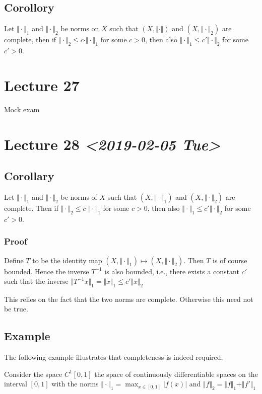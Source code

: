 \documentclass[11pt]{article}
\begin{document}
\subsection{Corollory}
\label{sec:org3adc4fb}
Let \(\Vert \cdot \Vert_1\) and \(\Vert \cdot \Vert_2\) be norms on \(X\) such that
\((X, \Vert \cdot \Vert)\) and \((X, \Vert \cdot \Vert_2)\) are complete, then if
\(\Vert \cdot \Vert_2 \le c \cdot \Vert \cdot \Vert_1\) for some \(c > 0\), then
also \(\Vert \cdot \Vert_1 \le c' \Vert \cdot \Vert_2\) for some \(c' > 0\).
\section{Lecture 27}
\label{sec:org9ed571a}
Mock exam
\section{Lecture 28 \textit{<2019-02-05 Tue>}}
\label{sec:org61a74e3}
\subsection{Corollary}
\label{sec:org6100ff2}
Let \(\Vert \cdot \Vert_1\) and \(\Vert \cdot \Vert_2\) be norms of \(X\) such that
\((X, \Vert \cdot \Vert_1)\) and \((X, \Vert \cdot \Vert_2)\) are complete. Then
if \(\Vert \cdot \Vert_2 \le c \cdot \Vert \cdot \Vert_1\) for some \(c > 0\),
then also \(\Vert \cdot \Vert_1 \le c' \Vert \cdot \Vert_2\) for some \(c' > 0\).
\subsubsection{Proof}
\label{sec:org9a93efc}
Define \(T\) to be the identity map \((X, \Vert \cdot \Vert_1) \mapsto (X,
    \Vert \cdot \Vert_2)\). Then \(T\) is of course bounded. Hence the inverse
\(T^{-1}\) is also bounded, i.e., there exists a constant \(c'\) such that the
inverse \(\Vert T^{-1} x\Vert_1 = \Vert x \Vert_1 \le c' \Vert x \Vert_2\)

This relies on the fact that the two norms are complete. Otherwise this need
not be true.
\subsection{Example}
\label{sec:org14a1ab7}
The following example illustrates that completeness is indeed required.

Consider the space \(C^{1}[0, 1]\) the space of continuously differentiable
spaces on the interval \([0, 1]\) with the norms \(\Vert \cdot \Vert_1 = \max_{x
   \in [0, 1]} \vert f(x) \vert\) and \(\Vert f\Vert_2 = \Vert f \Vert_1+ \Vert
   f'\Vert_1\)
\end{document}
